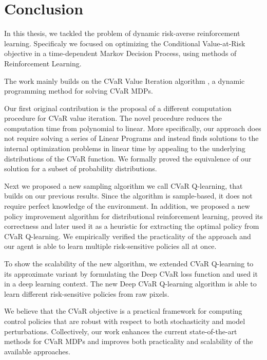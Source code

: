 \chapter{Conclusion}\label{ch:conclusion}

In this thesis, we tackled the problem of dynamic risk-averse reinforcement learning. Specificaly we focused on optimizing the Conditional Value-at-Risk objective in a time-dependent Markov Decision Process, using methods of Reinforcement Learning.

The work mainly builds on the CVaR Value Iteration algorithm \citep{chow2015risk}, a dynamic programming method for solving CVaR MDPs. 

Our first original contribution is the proposal of a different computation procedure for CVaR value iteration. The novel procedure reduces the computation time from polynomial to linear. More specifically, our approach does not require solving a series of Linear Programs and instead finds solutions to the internal optimization problems in linear time by appealing to the underlying distributions of the CVaR function. We formally proved the equivalence of our solution for a subset of probability distributions.

Next we proposed a new sampling algorithm we call CVaR Q-learning, that builds on our previous results. Since the algorithm is sample-based, it does not require perfect knowledge of the environment. 
In addition, we proposed a new policy improvement algorithm for distributional reinforcement learning, proved its correctness and later used it as a heuristic for extracting the optimal policy from CVaR Q-learning. We empirically verified the practicality of the approach and our agent is able to learn multiple risk-sensitive policies all at once.

To show the scalability of the new algorithm, we extended CVaR Q-learning to its approximate variant by formulating the Deep CVaR loss function and used it in a deep learning context. The new Deep CVaR Q-learning algorithm is able to learn different risk-sensitive policies from raw pixels.

\bigskip

We believe that the CVaR objective is a practical framework for computing control policies that are robust with respect to both stochasticity and model perturbations. Collectively, our work enhances the current state-of-the-art methods for CVaR MDPs and improves both practicality and scalability of the available approaches. 



